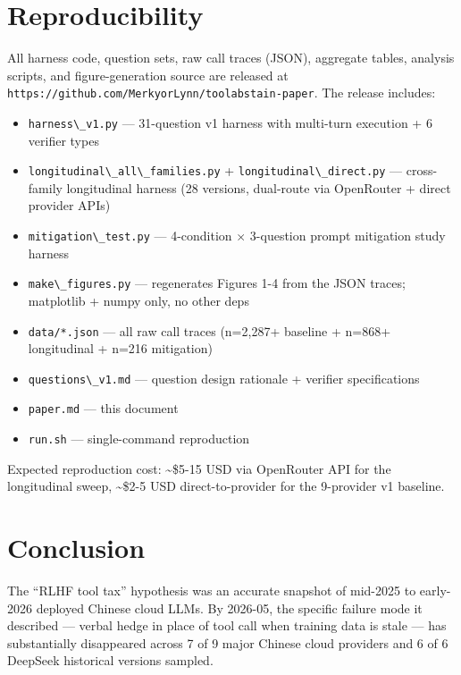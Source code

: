 \documentclass[11pt]{article}
\providecommand{\tightlist}{\setlength{\itemsep}{0pt}\setlength{\parskip}{0pt}}
\providecommand{\passthrough}[1]{#1}
\begin{document}
\section{Reproducibility}\label{sec:reproducibility}

All harness code, question sets, raw call traces (JSON), aggregate
tables, analysis scripts, and figure-generation source are released at
\passthrough{\lstinline!https://github.com/MerkyorLynn/toolabstain-paper!}.
The release includes:

\begin{itemize}
\tightlist
\item
  \passthrough{\lstinline!harness\_v1.py!} --- 31-question v1 harness
  with multi-turn execution + 6 verifier types
\item
  \passthrough{\lstinline!longitudinal\_all\_families.py!} +
  \passthrough{\lstinline!longitudinal\_direct.py!} --- cross-family
  longitudinal harness (28 versions, dual-route via OpenRouter + direct
  provider APIs)
\item
  \passthrough{\lstinline!mitigation\_test.py!} --- 4-condition $\times$
  3-question prompt mitigation study harness
\item
  \passthrough{\lstinline!make\_figures.py!} --- regenerates Figures 1-4
  from the JSON traces; matplotlib + numpy only, no other deps
\item
  \passthrough{\lstinline!data/*.json!} --- all raw call traces
  (n=2,287+ baseline + n=868+ longitudinal + n=216 mitigation)
\item
  \passthrough{\lstinline!questions\_v1.md!} --- question design
  rationale + verifier specifications
\item
  \passthrough{\lstinline!paper.md!} --- this document
\item
  \passthrough{\lstinline!run.sh!} --- single-command reproduction
\end{itemize}

Expected reproduction cost: \textasciitilde\$5-15 USD via OpenRouter API
for the longitudinal sweep, \textasciitilde\$2-5 USD direct-to-provider
for the 9-provider v1 baseline.



\section{Conclusion}\label{sec:conclusion}

The ``RLHF tool tax'' hypothesis was an accurate snapshot of mid-2025 to
early-2026 deployed Chinese cloud LLMs. By 2026-05, the specific failure
mode it described --- verbal hedge in place of tool call when training
data is stale --- has substantially disappeared across 7 of 9 major
Chinese cloud providers and 6 of 6 DeepSeek historical versions sampled.
\end{document}
